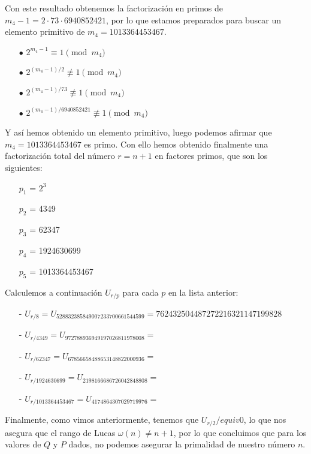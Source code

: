 \documentclass[fleqn]{article}
\begin{document}
    Con este resultado obtenemos la factorización en primos de $m_{4} - 1 = 2 \cdot 73 \cdot 6940852421$, por lo que estamos preparados para buscar un elemento primitivo de $m_{4} = 1013364453467$.
    \begin{enumerate}
        \item[$\bullet$] $2^{m_{4} -1} \equiv 1 \pmod{m_{4}}$
        \item[$\bullet$] $2^{(m_{4} -1)/2} \not\equiv 1 \pmod{m_{4}}$
        \item[$\bullet$] $2^{(m_{4} -1)/73} \not\equiv 1 \pmod{m_{4}}$
        \item[$\bullet$] $2^{(m_{4} -1)/6940852421} \not\equiv 1 \pmod{m_{4}}$
    \end{enumerate}
    Y así hemos obtenido un elemento primitivo, luego podemos afirmar que $m_{4} = 1013364453467$ es primo.
    Con ello hemos obtenido finalmente una factorización total del número $r = n+1$ en factores primos, que son los siguientes:
    \begin{enumerate}
        \item[$p_1$ =] $2^3$
        \item[$p_2$ =] 4349
        \item[$p_3$ =] 62347
        \item[$p_4$ =] 1924630699 
        \item[$p_5$ =] 1013364453467 
    \end{enumerate}
    Calculemos a continuación $U_{r/p}$ para cada $p$ en la lista anterior:
    \begin{enumerate}
        \item[-] $U_{r/8} = U_ {528832385849007233700661544599} = 762432504487272216321147199828$ %
        \item[-] $U_{r/4349} = U_ {972788936949197026811978008} = $
        \item[-] $U_{r/62347} = U_ {67856658488653148822000936} = $
        \item[-] $U_{r/1924630699} = U_ {2198166686726042848808} = $
        \item[-] $U_{r/1013364453467} = U_ {4174864307029719976} = $
    \end{enumerate}

    Finalmente, como vimos anteriormente, tenemos que $U_{r/2} /equiv 0$, lo que nos asegura que el rango de Lucas $\omega(n) \neq n+1$, por lo
    que concluimos que para los valores de $Q$ y $P$ dados, no podemos asegurar la primalidad de nuestro número $n$.
\end{document}
